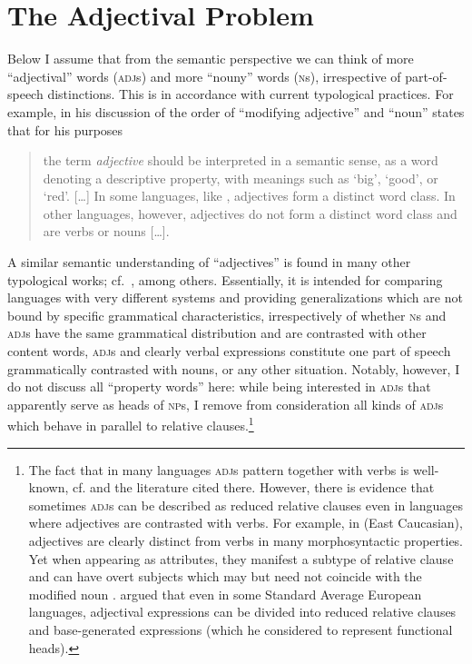 \documentclass[output=paper
  ,nobabel
  ,draftmode
  ,colorlinks, citecolor=brown
]{langscibook}
\begin{document}
\section{The Adjectival Problem}\label{sec-adjprob}

Below I assume that from the semantic perspective we can think of more ``adjectival'' words (\textsc{adj}s) and more ``nouny'' words (\textsc{n}s), irrespective of part-of-speech distinctions. This is in accordance with current typological practices. For example, \citet{wals-87} in his discussion of the order of ``modifying adjective'' and ``noun'' states that for his purposes

\begin{quote}
    the term \emph{adjective} should be interpreted in a semantic sense, as a word denoting a
    descriptive property, with meanings such as `big', `good', or `red'. [\ldots] In some languages, like
    , adjectives form a distinct word class. In other languages, however, adjectives do not
    form a distinct word class and are verbs or nouns [\ldots{}]. \citep{wals-87}
\end{quote}
A similar semantic understanding of ``adjectives'' is found in many other typological works; cf.\ \citet*[670]{Haspelmath2010}, \citet*[6]{Riessler2016} among others. 
Essentially, it is intended for comparing languages with very different systems and providing generalizations which are not bound by specific grammatical characteristics, irrespectively of whether \textsc{n}s and \textsc{adj}s have the same grammatical distribution and are contrasted with other content words, \textsc{adj}s and clearly verbal expressions constitute one part of speech grammatically contrasted with nouns, or any other situation. Notably, however, I do not discuss all ``property words'' here: while being interested in \textsc{adj}s that apparently serve as heads of \textsc{np}s, I remove from consideration all kinds of \textsc{adj}s which behave in parallel to relative clauses.\footnote{The fact that in many languages \textsc{adj}s pattern together with verbs is well-known, cf. \citet{Beck2002}  and the literature cited there. However, there is evidence that sometimes \textsc{adj}s can be described as reduced relative clauses even in languages where adjectives are contrasted with verbs. For example, in  (East Caucasian), adjectives are clearly distinct from verbs in many morphosyntactic properties. Yet when appearing as attributes, they manifest a subtype of relative clause and can have overt subjects which may but need not coincide with the modified noun \citep[198--199]{Sumbatova2014}. \citet{Cinque2010} argued that even in some Standard Average European languages, adjectival expressions can be divided into reduced relative clauses and base-generated expressions (which he considered to represent functional heads).}
\end{document}
